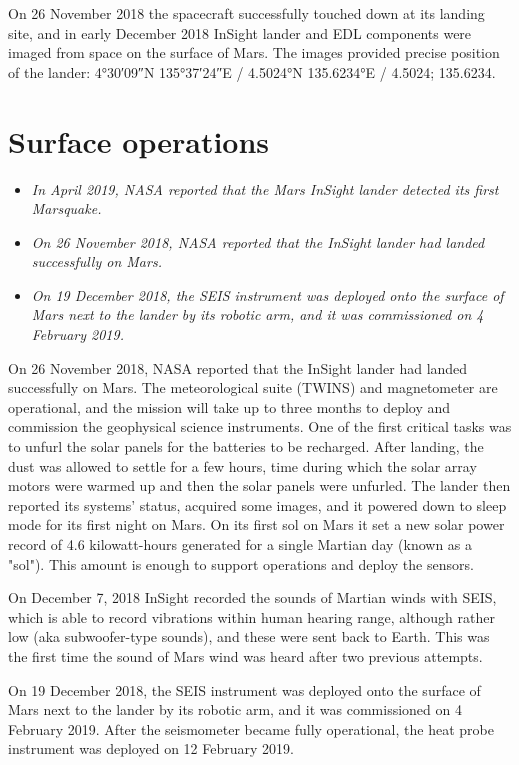 On 26 November 2018 the spacecraft successfully touched down at its
landing site, and in early December 2018 InSight lander and EDL
components were imaged from space on the surface of Mars. The images
provided precise position of the lander: 4°30′09″N 135°37′24″E﻿ /
﻿4.5024°N 135.6234°E﻿ / 4.5024; 135.6234.

\section{Surface operations}\label{surface-operations}

\begin{itemize}
\item
  \emph{In April 2019, NASA reported that the Mars InSight lander
  detected its first Marsquake.}
\item
  \emph{On 26 November 2018, NASA reported that the InSight lander had
  landed successfully on Mars.}
\item
  \emph{On 19 December 2018, the SEIS instrument was deployed onto the
  surface of Mars next to the lander by its robotic arm, and it was
  commissioned on 4 February 2019.}
\end{itemize}

On 26 November 2018, NASA reported that the InSight lander had landed
successfully on Mars. The meteorological suite (TWINS) and magnetometer
are operational, and the mission will take up to three months to deploy
and commission the geophysical science instruments. One of the first
critical tasks was to unfurl the solar panels for the batteries to be
recharged. After landing, the dust was allowed to settle for a few
hours, time during which the solar array motors were warmed up and then
the solar panels were unfurled. The lander then reported its systems'
status, acquired some images, and it powered down to sleep mode for its
first night on Mars. On its first sol on Mars it set a new solar power
record of 4.6 kilowatt-hours generated for a single Martian day (known
as a "sol"). This amount is enough to support operations and deploy the
sensors.

On December 7, 2018 InSight recorded the sounds of Martian winds with
SEIS, which is able to record vibrations within human hearing range,
although rather low (aka subwoofer-type sounds), and these were sent
back to Earth. This was the first time the sound of Mars wind was heard
after two previous attempts.

On 19 December 2018, the SEIS instrument was deployed onto the surface
of Mars next to the lander by its robotic arm, and it was commissioned
on 4 February 2019. After the seismometer became fully operational, the
heat probe instrument was deployed on 12 February 2019.

